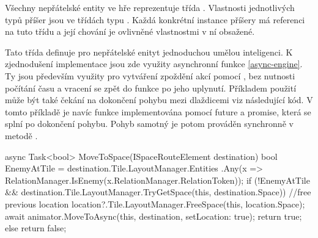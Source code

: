 Všechny nepřátelské entity ve hře reprezentuje třída . Vlastnosti jednotlivých typů příšer
jsou ve třídách typu . Každá konkrétní instance 
příšery má referenci na tuto třídu a její chování je ovlivněné vlastnostmi v ní obsažené. 

Tato třída definuje pro nepřátelské enityt jednoduchou umělou inteligenci. K zjednodušení implementace jsou zde využity 
asynchronní funkce \vref{async-engine}. Ty jsou především využity pro vytváření zpoždění akcí pomocí 
, bez nutnosti počítání času a vracení se zpět do funkce po jeho uplynutí. Příkladem 
použití může být také čekání na dokončení pohybu mezi dlaždicemi viz následující kód. V tomto příkladě
je navíc funkce  implementována pomocí future a promise, která se splní 
po dokončení pohybu. Pohyb samotný je potom prováděn synchronně v metodě .

\begin{code}
async Task<bool> MoveToSpace(ISpaceRouteElement destination)
{
 bool EnemyAtTile = destination.Tile.LayoutManager.Entities
  .Any(x => RelationManager.IsEnemy(x.RelationManager.RelationToken));
 if (!EnemyAtTile &&
  destination.Tile.LayoutManager.TryGetSpace(this, destination.Space))
 {
   //free previous location
   location?.Tile.LayoutManager.FreeSpace(this, location.Space);
   await animator.MoveToAsync(this, destination, setLocation: true);
   return true;
 }
 else
   return false;
}
\end{code}

